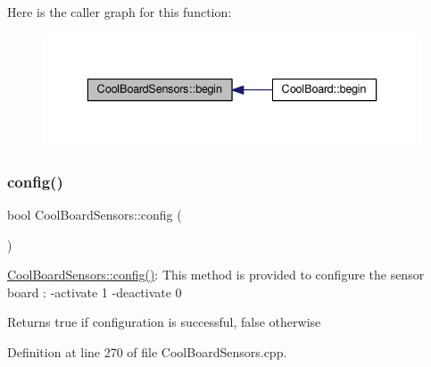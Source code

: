 Here is the caller graph for this function\+:\nopagebreak
\begin{figure}[H]
\begin{center}
\leavevmode
\includegraphics[width=336pt]{de/d46/class_cool_board_sensors_a97095823ef7c8f5290812f1405b966b3_icgraph}
\end{center}
\end{figure}
\mbox{\label{class_cool_board_sensors_a9a218895c5423375c33c08f2c56fb23a}} 
\subsubsection{\texorpdfstring{config()}{config()}}
{\footnotesize\ttfamily bool Cool\+Board\+Sensors\+::config (\begin{DoxyParamCaption}{ }\end{DoxyParamCaption})}

\hyperlink{class_cool_board_sensors_a9a218895c5423375c33c08f2c56fb23a}{Cool\+Board\+Sensors\+::config()}\+: This method is provided to configure the sensor board \+: -\/activate 1 -\/deactivate 0

\begin{DoxyReturn}{Returns}
true if configuration is successful, false otherwise 
\end{DoxyReturn}


Definition at line 270 of file Cool\+Board\+Sensors.\+cpp.


